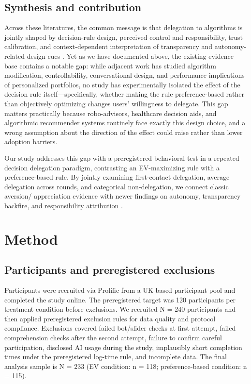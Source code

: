 \documentclass[a4paper, 12pt, fleqn]{article}
\theoremstyle{definition}
\begin{document}
\subsection{Synthesis and contribution}
Across these literatures, the common message is that delegation to algorithms is jointly shaped by decision-rule design, perceived control and responsibility, trust calibration, and context-dependent interpretation of transparency and autonomy-related design cues \citep{Dietvorst2018,Chugunova2022,Schaap2024,Fink2024,Hu2024}. Yet as we have documented above, the existing evidence base contains a notable gap: while adjacent work has studied algorithm modification, controllability, conversational design, and performance implications of personalized portfolios, no study has experimentally isolated the effect of the decision rule itself---specifically, whether making the rule preference-based rather than objectively optimizing changes users' willingness to delegate. This gap matters practically because robo-advisors, healthcare decision aids, and algorithmic recommender systems routinely face exactly this design choice, and a wrong assumption about the direction of the effect could raise rather than lower adoption barriers.

Our study addresses this gap with a preregistered behavioral test in a repeated-decision delegation paradigm, contrasting an EV-maximizing rule with a preference-based rule. By jointly examining first-contact delegation, average delegation across rounds, and categorical non-delegation, we connect classic aversion/ appreciation evidence with newer findings on autonomy, transparency backfire, and responsibility attribution \citep{Logg2019,Fink2024,Hu2024,Gazit2023}.

\section{Method}
\label{sec:method}

\subsection{Participants and preregistered exclusions}
Participants were recruited via Prolific from a UK-based participant pool and completed the study online. The preregistered target was 120 participants per treatment condition before exclusions. We recruited N = 240 participants and then applied preregistered exclusion rules for data quality and protocol compliance. Exclusions covered failed bot/slider checks at first attempt, failed comprehension checks after the second attempt, failure to confirm careful participation, disclosed AI usage during the study, implausibly short completion times under the preregistered log-time rule, and incomplete data. The final analysis sample is N = 233 (EV condition: n = 118; preference-based condition: n = 115).
\end{document}

